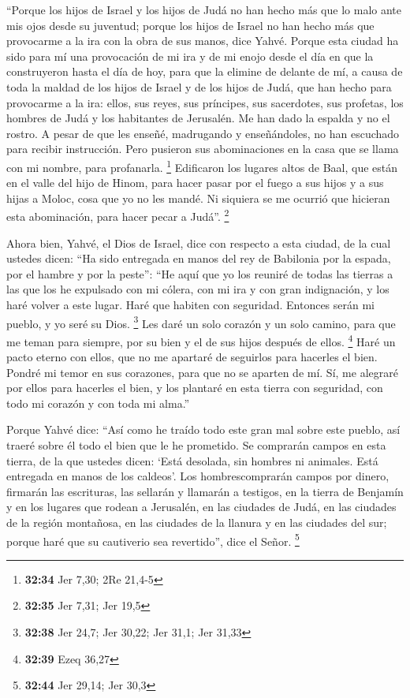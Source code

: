  ``Porque los hijos de Israel y los hijos de Judá no han
hecho más que lo malo ante mis ojos desde su juventud; porque los hijos
de Israel no han hecho más que provocarme a la ira con la obra de sus
manos, dice Yahvé.  Porque esta ciudad ha sido para mí
una provocación de mi ira y de mi enojo desde el día en que la
construyeron hasta el día de hoy, para que la elimine de delante de mí,
 a causa de toda la maldad de los hijos de Israel y de
los hijos de Judá, que han hecho para provocarme a la ira: ellos, sus
reyes, sus príncipes, sus sacerdotes, sus profetas, los hombres de Judá
y los habitantes de Jerusalén.  Me han dado la espalda y
no el rostro. A pesar de que les enseñé, madrugando y enseñándoles, no
han escuchado para recibir instrucción.  Pero pusieron
sus abominaciones en la casa que se llama con mi nombre, para
profanarla. \footnote{\textbf{32:34} Jer 7,30; 2Re 21,4-5}
 Edificaron los lugares altos de Baal, que están en el
valle del hijo de Hinom, para hacer pasar por el fuego a sus hijos y a
sus hijas a Moloc, cosa que yo no les mandé. Ni siquiera se me ocurrió
que hicieran esta abominación, para hacer pecar a Judá''. \footnote{\textbf{32:35}
  Jer 7,31; Jer 19,5}

 Ahora bien, Yahvé, el Dios de Israel, dice con respecto
a esta ciudad, de la cual ustedes dicen: ``Ha sido entregada en manos
del rey de Babilonia por la espada, por el hambre y por la peste'':
 ``He aquí que yo los reuniré de todas las tierras a las
que los he expulsado con mi cólera, con mi ira y con gran indignación, y
los haré volver a este lugar. Haré que habiten con seguridad.
 Entonces serán mi pueblo, y yo seré su Dios. \footnote{\textbf{32:38}
  Jer 24,7; Jer 30,22; Jer 31,1; Jer 31,33}  Les daré un
solo corazón y un solo camino, para que me teman para siempre, por su
bien y el de sus hijos después de ellos. \footnote{\textbf{32:39} Ezeq
  36,27}  Haré un pacto eterno con ellos, que no me
apartaré de seguirlos para hacerles el bien. Pondré mi temor en sus
corazones, para que no se aparten de mí.  Sí, me alegraré
por ellos para hacerles el bien, y los plantaré en esta tierra con
seguridad, con todo mi corazón y con toda mi alma.''

 Porque Yahvé dice: ``Así como he traído todo este gran
mal sobre este pueblo, así traeré sobre él todo el bien que le he
prometido.  Se comprarán campos en esta tierra, de la que
ustedes dicen: `Está desolada, sin hombres ni animales. Está entregada
en manos de los caldeos'.  Los hombrescomprarán campos
por dinero, firmarán las escrituras, las sellarán y llamarán a testigos,
en la tierra de Benjamín y en los lugares que rodean a Jerusalén, en las
ciudades de Judá, en las ciudades de la región montañosa, en las
ciudades de la llanura y en las ciudades del sur; porque haré que su
cautiverio sea revertido'', dice el Señor. \footnote{\textbf{32:44} Jer
  29,14; Jer 30,3}

